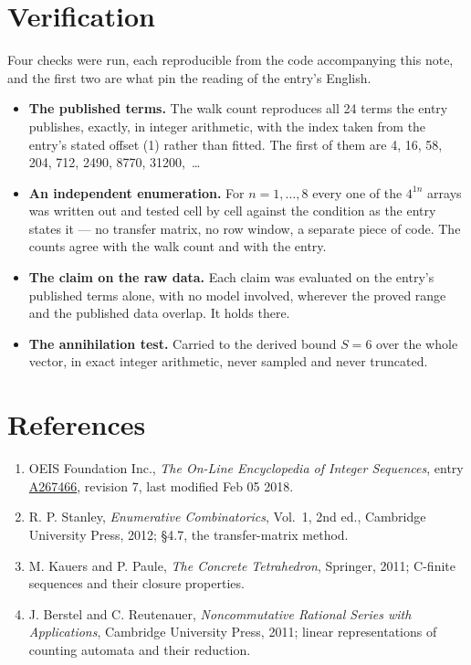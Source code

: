 \documentclass[11pt]{article}
\theoremstyle{definition}
\begin{document}
\section{Verification}

Four checks were run, each reproducible from the code accompanying this note, and the first two are what pin the reading of the entry's English.

\begin{itemize}

\item {\bfseries The published terms.} The walk count reproduces all 24 terms the entry publishes, exactly, in integer arithmetic, with the index taken from the entry's stated offset (1) rather than fitted. The first of them are 4, 16, 58, 204, 712, 2490, 8770, 31200,~\dots

\item {\bfseries An independent enumeration.} For $n = 1,\dots,8$ every one of the $4^{1n}$ arrays was written out and tested cell by cell against the condition as the entry states it --- no transfer matrix, no row window, a separate piece of code. The counts agree with the walk count and with the entry.

\item {\bfseries The claim on the raw data.} Each claim was evaluated on the entry's published terms alone, with no model involved, wherever the proved range and the published data overlap. It holds there.

\item {\bfseries The annihilation test.} Carried to the derived bound $S = 6$ over the whole vector, in exact integer arithmetic, never sampled and never truncated.

\end{itemize}

\section{References}

\begin{enumerate}

\item OEIS Foundation Inc., \emph{The On-Line Encyclopedia of Integer Sequences}, entry \href{https://oeis.org/A267466}{A267466}, revision 7, last modified Feb 05 2018.

\item R. P. Stanley, \emph{Enumerative Combinatorics}, Vol.~1, 2nd ed., Cambridge University Press, 2012; \S4.7, the transfer-matrix method.

\item M. Kauers and P. Paule, \emph{The Concrete Tetrahedron}, Springer, 2011; C-finite sequences and their closure properties.

\item J. Berstel and C. Reutenauer, \emph{Noncommutative Rational Series with Applications}, Cambridge University Press, 2011; linear representations of counting automata and their reduction.

\end{enumerate}
\end{document}
